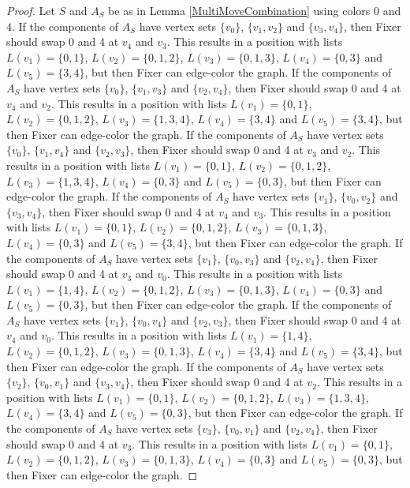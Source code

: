 \documentclass[12pt]{amsart}
\theoremstyle{plain}
\theoremstyle{definition}
\theoremstyle{remark}
\begin{document}
\begin{proof}
Let $S$ and $A_S$ be as in Lemma \ref{MultiMoveCombination} using colors $0$ and $4$. If the components of $A_S$ have vertex sets $\{v_0\}$, $\{v_1, v_2\}$ and $\{v_3, v_4\}$, then Fixer should swap 0 and 4 at $v_4$ and $v_3$. This results in a position with lists $L(v_1) = \{0, 1\}$, $L(v_2) = \{0, 1, 2\}$, $L(v_3) = \{0, 1, 3\}$, $L(v_4) = \{0, 3\}$ and $L(v_5) = \{3, 4\}$, but then Fixer can edge-color the graph.
If the components of $A_S$ have vertex sets $\{v_0\}$, $\{v_1, v_3\}$ and $\{v_2, v_4\}$, then Fixer should swap 0 and 4 at $v_4$ and $v_2$. This results in a position with lists $L(v_1) = \{0, 1\}$, $L(v_2) = \{0, 1, 2\}$, $L(v_3) = \{1, 3, 4\}$, $L(v_4) = \{3, 4\}$ and $L(v_5) = \{3, 4\}$, but then Fixer can edge-color the graph.
If the components of $A_S$ have vertex sets $\{v_0\}$, $\{v_1, v_4\}$ and $\{v_2, v_3\}$, then Fixer should swap 0 and 4 at $v_3$ and $v_2$. This results in a position with lists $L(v_1) = \{0, 1\}$, $L(v_2) = \{0, 1, 2\}$, $L(v_3) = \{1, 3, 4\}$, $L(v_4) = \{0, 3\}$ and $L(v_5) = \{0, 3\}$, but then Fixer can edge-color the graph.
If the components of $A_S$ have vertex sets $\{v_1\}$, $\{v_0, v_2\}$ and $\{v_3, v_4\}$, then Fixer should swap 0 and 4 at $v_4$ and $v_3$. This results in a position with lists $L(v_1) = \{0, 1\}$, $L(v_2) = \{0, 1, 2\}$, $L(v_3) = \{0, 1, 3\}$, $L(v_4) = \{0, 3\}$ and $L(v_5) = \{3, 4\}$, but then Fixer can edge-color the graph.
If the components of $A_S$ have vertex sets $\{v_1\}$, $\{v_0, v_3\}$ and $\{v_2, v_4\}$, then Fixer should swap 0 and 4 at $v_3$ and $v_0$. This results in a position with lists $L(v_1) = \{1, 4\}$, $L(v_2) = \{0, 1, 2\}$, $L(v_3) = \{0, 1, 3\}$, $L(v_4) = \{0, 3\}$ and $L(v_5) = \{0, 3\}$, but then Fixer can edge-color the graph.
If the components of $A_S$ have vertex sets $\{v_1\}$, $\{v_0, v_4\}$ and $\{v_2, v_3\}$, then Fixer should swap 0 and 4 at $v_4$ and $v_0$. This results in a position with lists $L(v_1) = \{1, 4\}$, $L(v_2) = \{0, 1, 2\}$, $L(v_3) = \{0, 1, 3\}$, $L(v_4) = \{3, 4\}$ and $L(v_5) = \{3, 4\}$, but then Fixer can edge-color the graph.
If the components of $A_S$ have vertex sets $\{v_2\}$, $\{v_0, v_1\}$ and $\{v_3, v_4\}$, then Fixer should swap 0 and 4 at $v_2$. This results in a position with lists $L(v_1) = \{0, 1\}$, $L(v_2) = \{0, 1, 2\}$, $L(v_3) = \{1, 3, 4\}$, $L(v_4) = \{3, 4\}$ and $L(v_5) = \{0, 3\}$, but then Fixer can edge-color the graph.
If the components of $A_S$ have vertex sets $\{v_3\}$, $\{v_0, v_1\}$ and $\{v_2, v_4\}$, then Fixer should swap 0 and 4 at $v_3$. This results in a position with lists $L(v_1) = \{0, 1\}$, $L(v_2) = \{0, 1, 2\}$, $L(v_3) = \{0, 1, 3\}$, $L(v_4) = \{0, 3\}$ and $L(v_5) = \{0, 3\}$, but then Fixer can edge-color the graph.

\end{proof}
\end{document}
